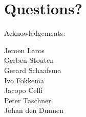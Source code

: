 \documentclass[slidestop]{beamer}
\begin{document}
\section{Questions?}
\lastpagetemplate
\begin{frame}
  \begin{center}
    Acknowledgements:
    \bigskip
    \bigskip

    Jeroen Laros\\
    Gerben Stouten\\
    Gerard Schaafsma\\
    Ivo Fokkema\\
    Jacopo Celli\\
    Peter Taschner\\
    Johan den Dunnen
    \bigskip
    \bigskip
    \bigskip

  \end{center}
\end{frame}
\end{document}
